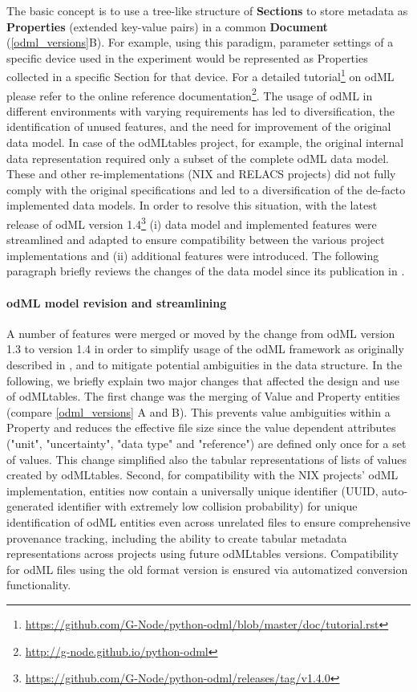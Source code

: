 The basic concept is to use a tree-like structure of \textbf{Sections} to store metadata as \textbf{Properties} (extended key-value pairs) in a common \textbf{Document} (\cref{odml_versions}B). For example, using this paradigm,  parameter settings of a specific device used in the experiment would be represented as Properties collected in a specific Section for that device. For a detailed tutorial\footnote{\url{https://github.com/G-Node/python-odml/blob/master/doc/tutorial.rst}} on odML please refer to the online reference documentation\footnote{\url{http://g-node.github.io/python-odml}}. The usage of odML in different environments with varying requirements has led to diversification, the identification of unused features, and the need for improvement of the original data model. In case of the odMLtables project, for example, the original internal data representation required only a subset of the complete odML data model. These and other re-implementations (NIX and RELACS projects) did not fully comply with the original specifications and led to a diversification of the de-facto implemented data models. In order to resolve this situation, with the latest release of odML version 1.4\footnote{\url{https://github.com/G-Node/python-odml/releases/tag/v1.4.0}} (i) data model and implemented features were streamlined and adapted to ensure compatibility between the various project implementations and (ii) additional features were introduced. The following paragraph briefly reviews the changes of the data model since its publication in \cite{Grewe_2011}.

\paragraph{odML model revision and streamlining}
A number of features were merged or moved by the change from odML version 1.3 to version 1.4 in order to simplify usage of the odML framework as originally described in \citet{Grewe_2011}, and to mitigate potential ambiguities in the data structure. In the following, we briefly explain two major changes that affected the design and use of odMLtables. The first change was the merging of Value and Property entities (compare \cref{odml_versions} A and B). This prevents value ambiguities within a Property and reduces the effective file size since the value dependent attributes ("unit", "uncertainty", "data type" and "reference") are defined only once for a set of values. This change simplified also the tabular representations of lists of values created by odMLtables. Second, for compatibility with the NIX projects' odML implementation, entities now contain a universally unique identifier (UUID, auto-generated identifier with extremely low collision probability) for unique identification of odML entities even across unrelated files to ensure comprehensive provenance tracking, including the ability to create tabular metadata representations across projects using future odMLtables versions. Compatibility for odML files using the old format version is ensured via automatized conversion functionality.

